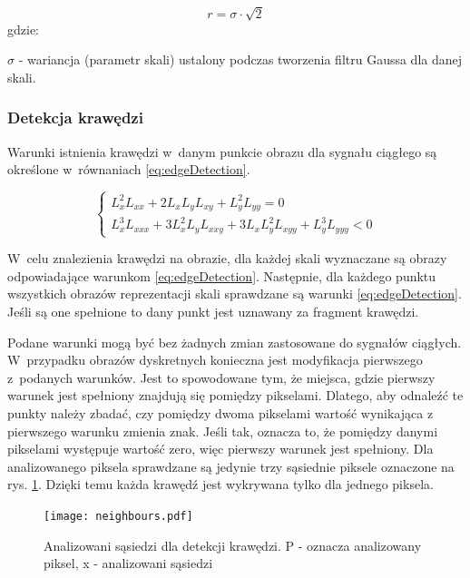 \begin{equation}
\label{eq:blobRadius}
r = \sigma \cdot \sqrt{2}
\end{equation}
gdzie:

$ \sigma $ - wariancja (parametr skali) ustalony podczas tworzenia filtru Gaussa dla danej skali.

\subsubsection{Detekcja krawędzi}
\label{subsubsec:detekcjaKrawedzi}

Warunki istnienia krawędzi w~danym punkcie obrazu dla sygnału ciągłego są określone w~równaniach \eqref{eq:edgeDetection}.

\begin{equation}
\label{eq:edgeDetection}
\left\{ \begin{array}{rl}
L_x^2 L_{xx} + 2L_xL_yL_{xy} + L_y^2L_{yy} = 0 \\
L_x^3L_{xxx} + 3L_x^2L_yL_{xxy} + 3L_xL_y^2L_{xyy} + L_y^3L_{yyy} < 0
\end{array} \right.
\end{equation}

W~celu znalezienia krawędzi na obrazie, dla każdej skali wyznaczane są obrazy odpowiadające warunkom \eqref{eq:edgeDetection}. Następnie, dla każdego punktu wszystkich obrazów reprezentacji skali sprawdzane są warunki \eqref{eq:edgeDetection}. Jeśli są one spełnione to dany punkt jest uznawany za fragment krawędzi.

Podane warunki mogą być bez żadnych zmian zastosowane do sygnałów ciągłych. W~przypadku obrazów dyskretnych konieczna jest modyfikacja pierwszego z~podanych warunków. Jest to spowodowane tym, że miejsca, gdzie pierwszy warunek jest spełniony znajdują się pomiędzy pikselami. Dlatego, aby odnaleźć te punkty należy zbadać, czy pomiędzy dwoma pikselami wartość wynikająca z pierwszego warunku zmienia znak. Jeśli tak, oznacza to, że pomiędzy danymi pikselami występuje wartość zero, więc pierwszy warunek jest spełniony. Dla analizowanego piksela sprawdzane są jedynie trzy sąsiednie piksele oznaczone na rys. \ref{fig:comparePixels}. Dzięki temu każda krawędź jest wykrywana tylko dla jednego piksela.

\begin{figure}
\begin{center}
\texttt{[image: neighbours.pdf]}
\end{center}
\caption{Analizowani sąsiedzi dla detekcji krawędzi. P - oznacza analizowany piksel, x - analizowani sąsiedzi}
\label{fig:comparePixels}
\end{figure}

